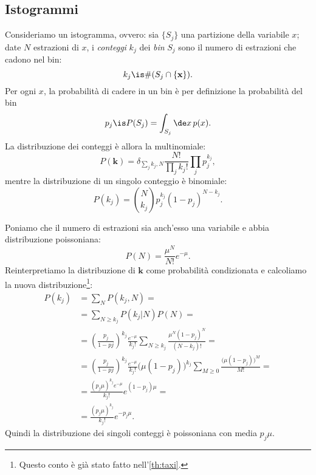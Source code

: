 
\subsection{Istogrammi}
\label{sec:hist}

Consideriamo un istogramma, ovvero:
sia $\{S_j\}$ una partizione della variabile $x$;
date $N$ estrazioni di $x$, i \emph{conteggi} $k_j$ dei \emph{bin} $S_j$
sono il numero di estrazioni che cadono nel bin:
\begin{equation*}
	k_j \is \# (S_j \cap \{\mathbf x\}).
\end{equation*}
Per ogni $x$, la probabilità di cadere in un bin è per definizione la probabilità del bin
\begin{equation*}
	p_j \is P(S_j) = \int_{S_j} \de x\,p(x).
\end{equation*}
La distribuzione dei conteggi è allora la multinomiale:
\begin{equation*}
	P(\mathbf k)
	= \delta_{\sum_jk_j,N} \frac{N!}{\prod_jk_j!}\prod_j p_j^{k_j},
\end{equation*}
mentre la distribuzione di un singolo conteggio è binomiale:
\begin{equation*}
	P(k_j) = \binom N{k_j} p_j^{k_j} (1-p_j)^{N-k_j}.
\end{equation*}

Poniamo che il numero di estrazioni sia anch'esso una variabile e abbia distribuzione poissoniana:
\begin{equation*}
	P(N)
	= \frac{\mu^N}{N!}e^{-\mu}.
\end{equation*}
Reinterpretiamo la distribuzione di $\mathbf k$ come probabilità condizionata e calcoliamo la nuova distribuzione\footnote{Questo conto è già stato fatto nell'\autoref{th:taxi}.}:
\begin{align*}
	P(k_j)
	&= \sum_N P(k_j,N) = \\
	&= \sum_{N\ge k_j} P(k_j|N) P(N) = \\
	&= \left(\frac{p_j}{1-pj}\right)^{k_j} \frac{e^{-\mu}}{k_j!}
	\sum_{N\ge k_j} \frac{\mu^N (1-p_j)^N}{(N-k_j)!} = \\
	&= \left(\frac{p_j}{1-pj}\right)^{k_j} \frac{e^{-\mu}}{k_j!}
	\big(\mu(1-p_j)\big)^{k_j} \sum_{M\ge 0} \frac{\big(\mu(1-p_j)\big)^M}{M!} = \\
	&= \frac{(p_j\mu)^{k_j} e^{-\mu}}{k_j!} e^{(1-p_j)\mu} = \\
	&= \frac{(p_j\mu)^{k_j}}{k_j!} e^{-p_j\mu}.
\end{align*}
Quindi la distribuzione dei singoli conteggi è poissoniana con media $p_j\mu$.

